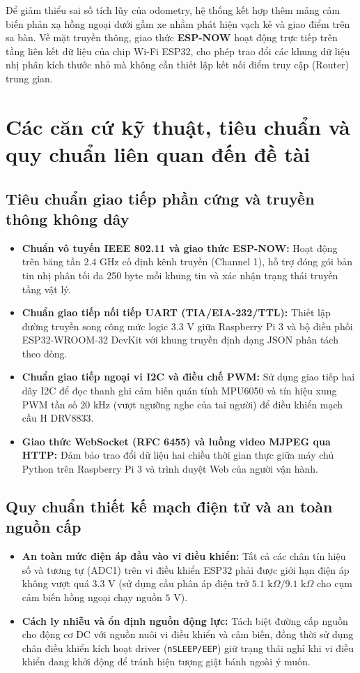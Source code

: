 \documentclass[12pt,a4paper]{report}
\begin{document}
	Để giảm thiểu sai số tích lũy của odometry, hệ thống kết hợp thêm mảng cảm biến phản xạ hồng ngoại dưới gầm xe nhằm phát hiện vạch kẻ và giao điểm trên sa bàn. Về mặt truyền thông, giao thức \textbf{ESP-NOW} hoạt động trực tiếp trên tầng liên kết dữ liệu của chip Wi-Fi ESP32, cho phép trao đổi các khung dữ liệu nhị phân kích thước nhỏ mà không cần thiết lập kết nối điểm truy cập (Router) trung gian.
	
	\section{Các căn cứ kỹ thuật, tiêu chuẩn và quy chuẩn liên quan đến đề tài}
	
	\subsection{Tiêu chuẩn giao tiếp phần cứng và truyền thông không dây}
	\begin{itemize}[leftmargin=1.2cm]
		\item \textbf{Chuẩn vô tuyến IEEE 802.11 và giao thức ESP-NOW:} Hoạt động trên băng tần $2.4\text{ GHz}$ cố định kênh truyền (Channel 1), hỗ trợ đóng gói bản tin nhị phân tối đa 250 byte mỗi khung tin và xác nhận trạng thái truyền tầng vật lý.
		\item \textbf{Chuẩn giao tiếp nối tiếp UART (TIA/EIA-232/TTL):} Thiết lập đường truyền song công mức logic $3.3\text{ V}$ giữa Raspberry Pi 3 và bộ điều phối ESP32-WROOM-32 DevKit với khung truyền định dạng JSON phân tách theo dòng.
		\item \textbf{Chuẩn giao tiếp ngoại vi I2C và điều chế PWM:} Sử dụng giao tiếp hai dây I2C để đọc thanh ghi cảm biến quán tính MPU6050 và tín hiệu xung PWM tần số $20\text{ kHz}$ (vượt ngưỡng nghe của tai người) để điều khiển mạch cầu H DRV8833.
		\item \textbf{Giao thức WebSocket (RFC 6455) và luồng video MJPEG qua HTTP:} Đảm bảo trao đổi dữ liệu hai chiều thời gian thực giữa máy chủ Python trên Raspberry Pi 3 và trình duyệt Web của người vận hành.
	\end{itemize}
	
	\subsection{Quy chuẩn thiết kế mạch điện tử và an toàn nguồn cấp}
	\begin{itemize}[leftmargin=1.2cm]
		\item \textbf{An toàn mức điện áp đầu vào vi điều khiển:} Tất cả các chân tín hiệu số và tương tự (ADC1) trên vi điều khiển ESP32 phải được giới hạn điện áp không vượt quá $3.3\text{ V}$ (sử dụng cầu phân áp điện trở $5.1\text{ k}\Omega / 9.1\text{ k}\Omega$ cho cụm cảm biến hồng ngoại chạy nguồn $5\text{ V}$).
		\item \textbf{Cách ly nhiễu và ổn định nguồn động lực:} Tách biệt đường cấp nguồn cho động cơ DC với nguồn nuôi vi điều khiển và cảm biến, đồng thời sử dụng chân điều khiển kích hoạt driver (\texttt{nSLEEP/EEP}) giữ trạng thái nghỉ khi vi điều khiển đang khởi động để tránh hiện tượng giật bánh ngoài ý muốn.
	\end{itemize}
	
\end{document}
